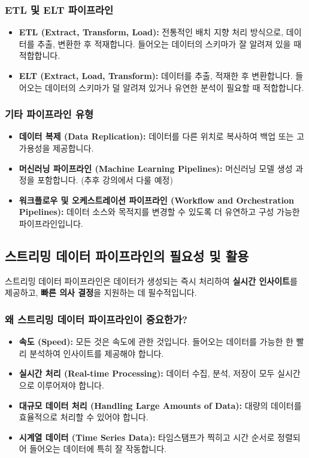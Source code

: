 \documentclass[11pt,a4paper]{article}
\theoremstyle{definition}
\begin{document}
\subsubsection{ETL 및 ELT 파이프라인}
\begin{itemize}
    \item \textbf{ETL (Extract, Transform, Load):} 전통적인 배치 지향 처리 방식으로, 데이터를 추출, 변환한 후 적재합니다. 들어오는 데이터의 스키마가 잘 알려져 있을 때 적합합니다.
    \item \textbf{ELT (Extract, Load, Transform):} 데이터를 추출, 적재한 후 변환합니다. 들어오는 데이터의 스키마가 덜 알려져 있거나 유연한 분석이 필요할 때 적합합니다.
\end{itemize}

\subsubsection{기타 파이프라인 유형}
\begin{itemize}
    \item \textbf{데이터 복제 (Data Replication):} 데이터를 다른 위치로 복사하여 백업 또는 고가용성을 제공합니다.
    \item \textbf{머신러닝 파이프라인 (Machine Learning Pipelines):} 머신러닝 모델 생성 과정을 포함합니다. (추후 강의에서 다룰 예정)
    \item \textbf{워크플로우 및 오케스트레이션 파이프라인 (Workflow and Orchestration Pipelines):} 데이터 소스와 목적지를 변경할 수 있도록 더 유연하고 구성 가능한 파이프라인입니다.
\end{itemize}

\subsection{스트리밍 데이터 파이프라인의 필요성 및 활용}

\begin{conceptbox}
스트리밍 데이터 파이프라인은 데이터가 생성되는 즉시 처리하여 \textbf{실시간 인사이트}를 제공하고, \textbf{빠른 의사 결정}을 지원하는 데 필수적입니다.
\end{conceptbox}

\subsubsection{왜 스트리밍 데이터 파이프라인이 중요한가?}
\begin{itemize}
    \item \textbf{속도 (Speed):} 모든 것은 속도에 관한 것입니다. 들어오는 데이터를 가능한 한 빨리 분석하여 인사이트를 제공해야 합니다.
    \item \textbf{실시간 처리 (Real-time Processing):} 데이터 수집, 분석, 저장이 모두 실시간으로 이루어져야 합니다.
    \item \textbf{대규모 데이터 처리 (Handling Large Amounts of Data):} 대량의 데이터를 효율적으로 처리할 수 있어야 합니다.
    \item \textbf{시계열 데이터 (Time Series Data):} 타임스탬프가 찍히고 시간 순서로 정렬되어 들어오는 데이터에 특히 잘 작동합니다.
\end{itemize}
\end{document}
